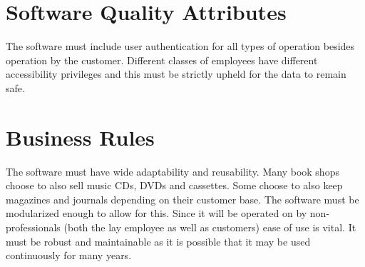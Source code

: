 \documentclass{scrreprt}
\begin{document}
\section{Software Quality Attributes}
The software must include user authentication for all types of operation besides operation by the customer. Different classes of employees have different accessibility privileges and this must be strictly upheld for the data to remain safe.

\section{Business Rules}
The software must have wide adaptability and reusability. Many book shops choose to also sell music CDs, DVDs and cassettes. Some choose to also keep magazines and journals depending on their customer base. The software must be modularized enough to allow for this. Since it will be operated on by non-professionals (both the lay employee as well as customers) ease of use is vital. It must be robust and maintainable as it is possible that it may be used continuously for many years.


\end{document}
